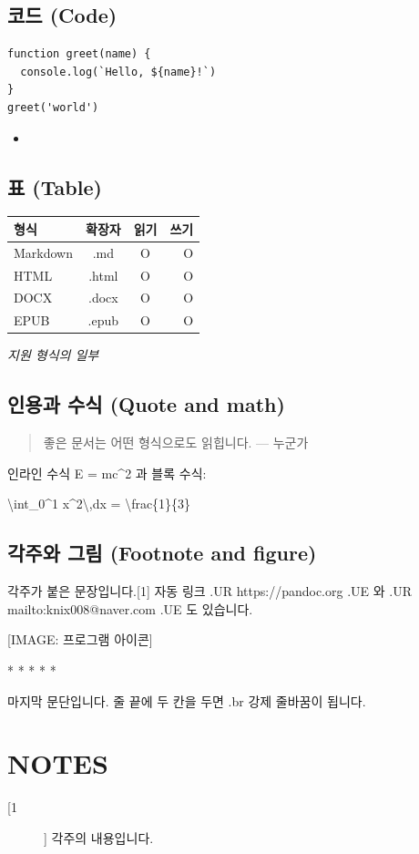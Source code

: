 \documentclass[11pt]{article}
\begin{document}
\subsection*{코드 (Code)}\label{코드-code}

\begin{verbatim}
function greet(name) {
  console.log(`Hello, ${name}!`)
}
greet('world')
\end{verbatim}

\begin{itemize}
\item 
\end{itemize}

\subsection*{표 (Table)}\label{표-table}

\begin{table}[htbp]
\centering
\begin{tabular}{lccr}
\toprule
형식 & 확장자 & 읽기 & 쓰기 \\
\midrule
Markdown & .md & O & O \\
HTML & .html & O & O \\
DOCX & .docx & O & O \\
EPUB & .epub & O & O \\
\bottomrule
\end{tabular}
\end{table}

\emph{지원 형식의 일부}

\subsection*{인용과 수식 (Quote and math)}\label{인용과-수식-quote-and-math}

\begin{quote}
좋은 문서는 어떤 형식으로도 읽힙니다.
--- 누군가
\end{quote}

인라인 수식 E = mc\^{}2 과 블록 수식:

\textbackslash{}int\_0\^{}1 x\^{}2\textbackslash{},dx =
\textbackslash{}frac\{1\}\{3\}

\subsection*{각주와 그림 (Footnote and figure)}\label{각주와-그림-footnote-and-figure}

각주가 붙은 문장입니다.[1] 자동 링크 
.UR https://pandoc.org
.UE 
와 
.UR mailto:knix008@naver.com
.UE 
도 있습니다.

[IMAGE: 프로그램 아이콘]

* * * * *

마지막 문단입니다. 줄 끝에 두 칸을 두면
.br
강제 줄바꿈이 됩니다.

\section*{NOTES}\label{notes}

\begin{description}
\item[[1]] 각주의 내용입니다.
\end{description}
\end{document}
